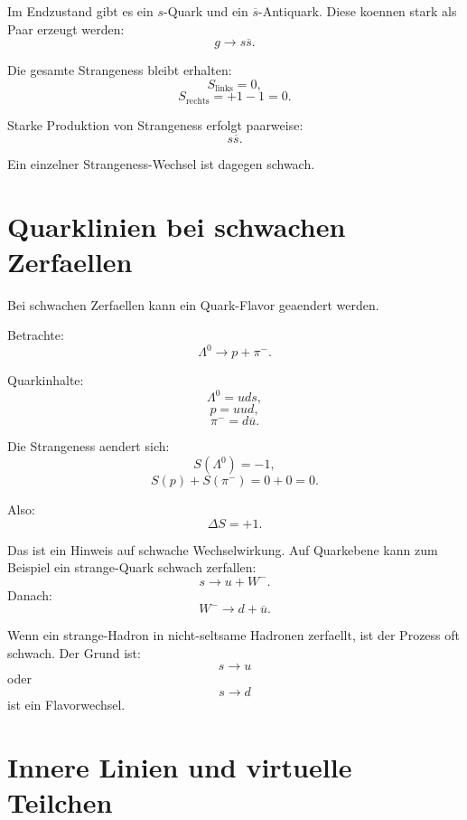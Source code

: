 \begin{conceptbox}
Im Endzustand gibt es ein $s$-Quark und ein $\overline{s}$-Antiquark.
Diese koennen stark als Paar erzeugt werden:
\[
    g \rightarrow s\overline{s}.
\]

Die gesamte Strangeness bleibt erhalten:
\[
    S_{\mathrm{links}}=0,
\]
\[
    S_{\mathrm{rechts}}=+1-1=0.
\]
\end{conceptbox}

\begin{examtipbox}
Starke Produktion von Strangeness erfolgt paarweise:
\[
    s\overline{s}.
\]

Ein einzelner Strangeness-Wechsel ist dagegen schwach.
\end{examtipbox}

\section{Quarklinien bei schwachen Zerfaellen}

Bei schwachen Zerfaellen kann ein Quark-Flavor geaendert werden.

\begin{examplebox}
Betrachte:
\[
    \Lambda^0 \rightarrow p+\pi^-.
\]

Quarkinhalte:
\[
    \Lambda^0=uds,
\]
\[
    p=uud,
\]
\[
    \pi^-=d\overline{u}.
\]
\end{examplebox}

\begin{conceptbox}
Die Strangeness aendert sich:
\[
    S(\Lambda^0)=-1,
\]
\[
    S(p)+S(\pi^-)=0+0=0.
\]

Also:
\[
    \Delta S=+1.
\]

Das ist ein Hinweis auf schwache Wechselwirkung.
Auf Quarkebene kann zum Beispiel ein strange-Quark schwach zerfallen:
\[
    s \rightarrow u + W^-.
\]
Danach:
\[
    W^- \rightarrow d+\overline{u}.
\]
\end{conceptbox}

\begin{examtipbox}
Wenn ein strange-Hadron in nicht-seltsame Hadronen zerfaellt, ist der Prozess oft
schwach.
Der Grund ist:
\[
    s \rightarrow u
\]
oder
\[
    s \rightarrow d
\]
ist ein Flavorwechsel.
\end{examtipbox}

\section{Innere Linien und virtuelle Teilchen}

